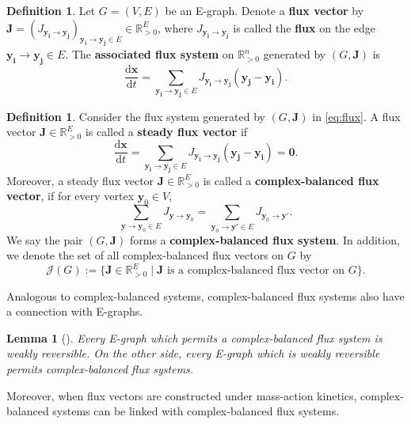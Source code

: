\documentclass[11pt]{article}
\theoremstyle{plain}
\newtheorem{lemma}[theorem]{Lemma}
\theoremstyle{definition}
\newtheorem{definition}[theorem]{Definition}
\theoremstyle{remark}
\newcommand\RR{\mathbb{R}}
\newcommand\by{\boldsymbol{y}}
\newcommand\byi{\boldsymbol{y_i}}
\newcommand\byj{\boldsymbol{y_j}}
\newcommand\bx{\boldsymbol{x}}
\newcommand\bJ{\boldsymbol{J}}
\newcommand{\defi}{\textbf}
\begin{document}
\begin{definition}
Let $G=(V, E)$ be an E-graph. 
Denote a \defi{flux vector} by $\bJ = (J_{\byi \to \byj})_{\byi \to \byj \in E} \in \RR_{>0}^E$, where $J_{\byi \to \byj}$ is called the \defi{flux} on the edge $\byi \to \byj \in E$. The \defi{associated flux system} on $\RR_{>0}^n$ generated by $(G, \bJ)$ is 
\begin{equation} \label{eq:flux}
 \frac{\mathrm{d} \bx}{\mathrm{d} t} 
= \sum_{\byi \to \byj \in E} J_{\byi \to \byj} 
(\byj - \byi).
\end{equation}
\end{definition}

\begin{definition}
\label{def:fluxVectors}
Consider the flux system generated by $(G, \bJ)$ in \eqref{eq:flux}. 
A flux vector $\bJ \in \RR_{>0}^E$ is called a \defi{steady flux vector} if 
\begin{equation}
\frac{\mathrm{d} \bx}{\mathrm{d} t} 
= \sum_{\byi \to \byj \in E} J_{\byi \to \byj} 
(\byj - \byi) = \mathbf{0}.
\end{equation}
Moreover, a steady flux vector $\bJ \in \RR_{>0}^E$ is called a \defi{complex-balanced flux vector}, if for every vertex $\by_0 \in V$,
\begin{equation}
\sum_{\by \to \by_0 \in E} J_{\by \to \by_0} 
= \sum_{\by_0 \to \by' \in E} J_{\by_0 \to \by'}.
\end{equation} 
We say the pair $(G, \bJ)$ forms a \defi{complex-balanced flux system}. In addition, we denote the set of all complex-balanced flux vectors on $G$ by
\begin{equation} 
\mathcal{J}(G):=
\{\bJ \in \RR_{>0}^{E} \mid \bJ  \text{ is a complex-balanced flux vector on $G$}\}.
\end{equation}
\end{definition}

Analogous to complex-balanced systems, complex-balanced flux systems also have a connection with E-graphs.

\begin{lemma}[\cite{craciun2020efficient}]
Every E-graph which permits a complex-balanced flux system is weakly reversible.
On the other side, every E-graph which is weakly reversible permits complex-balanced flux systems.
\end{lemma}

Moreover, when flux vectors are constructed under mass-action kinetics, complex-balanced systems can be linked with complex-balanced flux systems.
\end{document}
